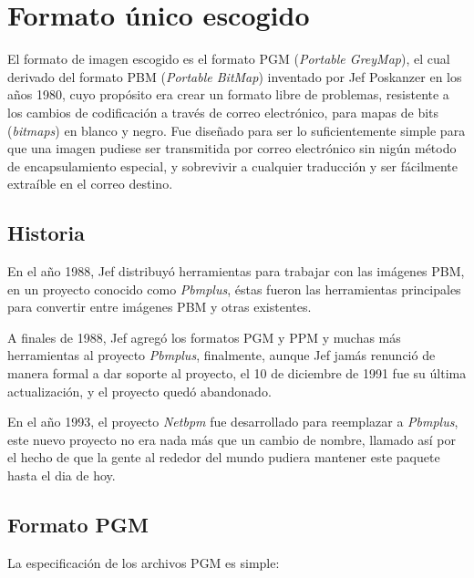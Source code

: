 \section{Formato único escogido}
\label{ch:implementacion:sec:formatounicoescogido}

El formato de imagen escogido es el formato PGM (\emph{Portable GreyMap}), el cual derivado del formato PBM (\emph{Portable BitMap}) inventado por Jef Poskanzer en los años 1980, cuyo propósito era crear un formato libre de problemas, resistente a los cambios de codificación a través de correo electrónico, para mapas de bits (\emph{bitmaps}) en blanco y negro. Fue diseñado para ser lo suficientemente simple para que una imagen pudiese ser transmitida por correo electrónico sin nigún método de encapsulamiento especial, y sobrevivir a cualquier traducción y ser fácilmente extraíble en el correo destino.

\subsection{Historia}
\label{ch:implementacion:sec:formatounicoescogido:subsec:historia}

En el año 1988, Jef distribuyó herramientas para trabajar con las imágenes PBM, en un proyecto conocido como \emph{Pbmplus}, éstas fueron las herramientas principales para convertir entre imágenes PBM y otras existentes.

A finales de 1988, Jef agregó los formatos PGM y PPM y muchas más herramientas al proyecto \emph{Pbmplus}, finalmente, aunque Jef jamás renunció de manera formal a dar soporte al proyecto, el 10 de diciembre de 1991 fue su última actualización, y el proyecto quedó abandonado.

En el año 1993, el proyecto \emph{Netbpm} fue desarrollado para reemplazar a \emph{Pbmplus}, este nuevo proyecto no era nada más que un cambio de nombre, llamado así por el hecho de que la gente al rededor del mundo pudiera mantener este paquete hasta el dia de hoy.

\subsection{Formato PGM}
\label{ch:implementacion:sec:formatounicoescogido:subsec:formatopgm}

La especificación de los archivos PGM es simple:

